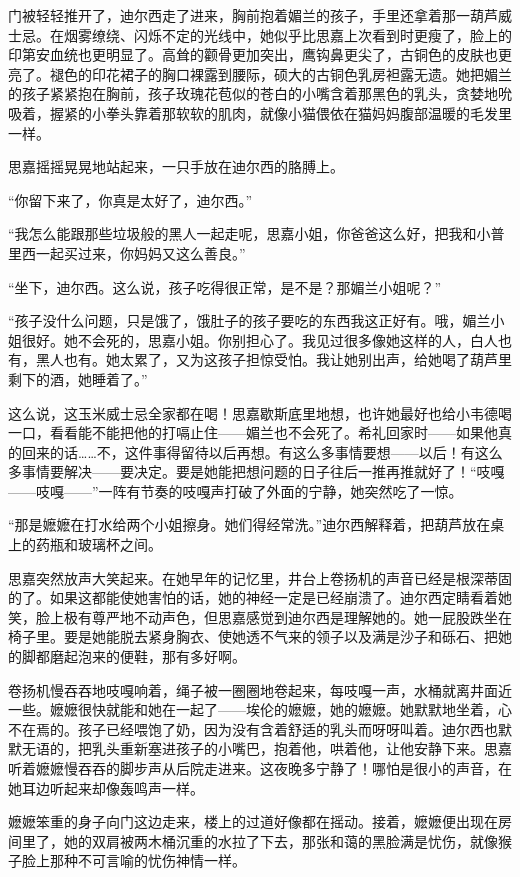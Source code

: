 \par 门被轻轻推开了，迪尔西走了进来，胸前抱着媚兰的孩子，手里还拿着那一葫芦威士忌。在烟雾缭绕、闪烁不定的光线中，她似乎比思嘉上次看到时更瘦了，脸上的印第安血统也更明显了。高耸的颧骨更加突出，鹰钩鼻更尖了，古铜色的皮肤也更亮了。褪色的印花裙子的胸口裸露到腰际，硕大的古铜色乳房袒露无遗。她把媚兰的孩子紧紧抱在胸前，孩子玫瑰花苞似的苍白的小嘴含着那黑色的乳头，贪婪地吮吸着，握紧的小拳头靠着那软软的肌肉，就像小猫偎依在猫妈妈腹部温暖的毛发里一样。
\par 思嘉摇摇晃晃地站起来，一只手放在迪尔西的胳膊上。
\par “你留下来了，你真是太好了，迪尔西。”
\par “我怎么能跟那些垃圾般的黑人一起走呢，思嘉小姐，你爸爸这么好，把我和小普里西一起买过来，你妈妈又这么善良。”
\par “坐下，迪尔西。这么说，孩子吃得很正常，是不是？那媚兰小姐呢？”
\par “孩子没什么问题，只是饿了，饿肚子的孩子要吃的东西我这正好有。哦，媚兰小姐很好。她不会死的，思嘉小姐。你别担心了。我见过很多像她这样的人，白人也有，黑人也有。她太累了，又为这孩子担惊受怕。我让她别出声，给她喝了葫芦里剩下的酒，她睡着了。”
\par 这么说，这玉米威士忌全家都在喝！思嘉歇斯底里地想，也许她最好也给小韦德喝一口，看看能不能把他的打嗝止住——媚兰也不会死了。希礼回家时——如果他真的回来的话……不，这件事得留待以后再想。有这么多事情要想——以后！有这么多事情要解决——要决定。要是她能把想问题的日子往后一推再推就好了！“吱嘎——吱嘎——”一阵有节奏的吱嘎声打破了外面的宁静，她突然吃了一惊。
\par “那是嬷嬷在打水给两个小姐擦身。她们得经常洗。”迪尔西解释着，把葫芦放在桌上的药瓶和玻璃杯之间。
\par 思嘉突然放声大笑起来。在她早年的记忆里，井台上卷扬机的声音已经是根深蒂固的了。如果这都能使她害怕的话，她的神经一定是已经崩溃了。迪尔西定睛看着她笑，脸上极有尊严地不动声色，但思嘉感觉到迪尔西是理解她的。她一屁股跌坐在椅子里。要是她能脱去紧身胸衣、使她透不气来的领子以及满是沙子和砾石、把她的脚都磨起泡来的便鞋，那有多好啊。
\par 卷扬机慢吞吞地吱嘎响着，绳子被一圈圈地卷起来，每吱嘎一声，水桶就离井面近一些。嬷嬷很快就能和她在一起了——埃伦的嬷嬷，她的嬷嬷。她默默地坐着，心不在焉的。孩子已经喂饱了奶，因为没有含着舒适的乳头而呀呀叫着。迪尔西也默默无语的，把乳头重新塞进孩子的小嘴巴，抱着他，哄着他，让他安静下来。思嘉听着嬷嬷慢吞吞的脚步声从后院走进来。这夜晚多宁静了！哪怕是很小的声音，在她耳边听起来却像轰鸣声一样。
\par 嬷嬷笨重的身子向门这边走来，楼上的过道好像都在摇动。接着，嬷嬷便出现在房间里了，她的双肩被两木桶沉重的水拉了下去，那张和蔼的黑脸满是忧伤，就像猴子脸上那种不可言喻的忧伤神情一样。
